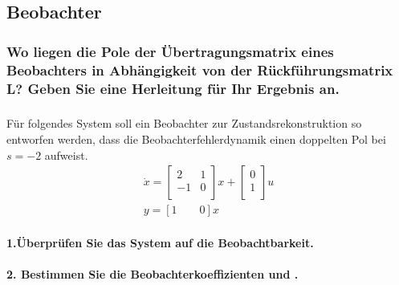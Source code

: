 \subsection{Beobachter}
\subsubsection{Wo liegen die Pole der Übertragungsmatrix eines Beobachters in Abhängigkeit von der Rückführungsmatrix
    L? Geben Sie eine Herleitung für Ihr Ergebnis an.}
\subsubsection{}
Für folgendes System soll ein Beobachter zur Zustandsrekonstruktion so entworfen werden, dass
die Beobachterfehlerdynamik einen doppelten Pol bei $s=-2$ aufweist.
\begin{equation}
    \begin{array}{l}
        \dot{x}=\left[\begin{array}{cc}
                2  & 1 \\
                -1 & 0 \\
            \end{array}\right]x+\left[\begin{array}{c}
                0 \\
                1 \\
            \end{array}\right]u \\
        y=\left[1\qquad 0\right]x
    \end{array}
\end{equation}
\paragraph{1.Überprüfen Sie das System auf die Beobachtbarkeit.
}
\paragraph{2. Bestimmen Sie die Beobachterkoeffizienten und .
}